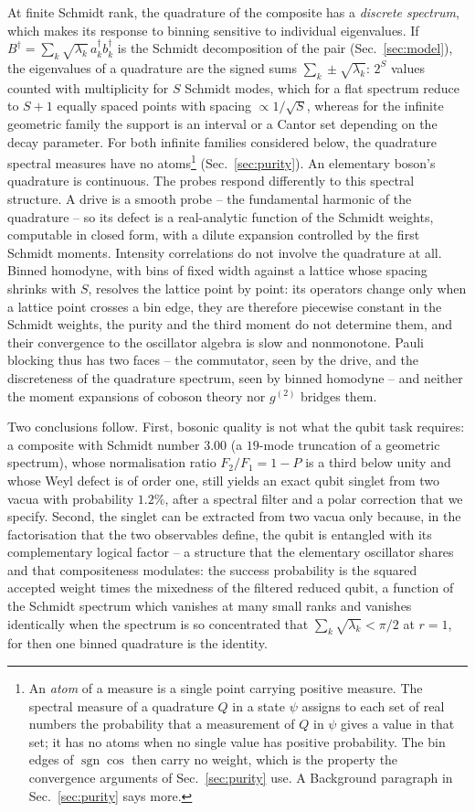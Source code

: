 \documentclass[11pt,a4paper]{article}
\newcommand{\sgn}{\operatorname{sgn}}
\begin{document}
At finite Schmidt rank, the quadrature of the composite has a \emph{discrete spectrum}, which makes its response to binning sensitive to individual eigenvalues. If $B^\dagger=\sum_k\sqrt{\lambda_k}\,a_k^\dagger b_k^\dagger$ is the Schmidt decomposition of the pair (Sec.~\ref{sec:model}), the eigenvalues of a quadrature are the signed sums $\sum_k\pm\sqrt{\lambda_k}$: $2^S$ values counted with multiplicity for $S$ Schmidt modes, which for a flat spectrum reduce to $S+1$ equally spaced points with spacing $\propto1/\sqrt S$, whereas for the infinite geometric family the support is an interval or a Cantor set depending on the decay parameter. For both infinite families considered below, the quadrature spectral measures have no atoms\footnote{An \emph{atom} of a measure is a single point carrying positive measure. The spectral measure of a quadrature $Q$ in a state $\psi$ assigns to each set of real numbers the probability that a measurement of $Q$ in $\psi$ gives a value in that set; it has no atoms when no single value has positive probability. The bin edges of $\sgn\cos$ then carry no weight, which is the property the convergence arguments of Sec.~\ref{sec:purity} use. A Background paragraph in Sec.~\ref{sec:purity} says more.} (Sec.~\ref{sec:purity}). An elementary boson's quadrature is continuous. The probes respond differently to this spectral structure. A drive is a smooth probe -- the fundamental harmonic of the quadrature -- so its defect is a real-analytic function of the Schmidt weights, computable in closed form, with a dilute expansion controlled by the first Schmidt moments. Intensity correlations do not involve the quadrature at all. Binned homodyne, with bins of fixed width against a lattice whose spacing shrinks with $S$, resolves the lattice point by point: its operators change only when a lattice point crosses a bin edge, they are therefore piecewise constant in the Schmidt weights, the purity and the third moment do not determine them, and their convergence to the oscillator algebra is slow and nonmonotone. Pauli blocking thus has two faces -- the commutator, seen by the drive, and the discreteness of the quadrature spectrum, seen by binned homodyne -- and neither the moment expansions of coboson theory nor $g^{(2)}$ bridges them.

Two conclusions follow. First, bosonic quality is not what the qubit task requires: a composite with Schmidt number $3.00$ (a $19$-mode truncation of a geometric spectrum), whose normalisation ratio $F_2/F_1=1-P$ is a third below unity and whose Weyl defect is of order one, still yields an exact qubit singlet from two vacua with probability $1.2\%$, after a spectral filter and a polar correction that we specify. Second, the singlet can be extracted from two vacua only because, in the factorisation that the two observables define, the qubit is entangled with its complementary logical factor -- a structure that the elementary oscillator shares and that compositeness modulates: the success probability is the squared accepted weight times the mixedness of the filtered reduced qubit, a function of the Schmidt spectrum which vanishes at many small ranks and vanishes identically when the spectrum is so concentrated that $\sum_k\sqrt{\lambda_k}<\pi/2$ at $r=1$, for then one binned quadrature is the identity.
\end{document}
